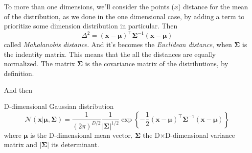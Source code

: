 \begin{frame}{\insertsubsection}
	To more than one dimensions, we'll consider the points ($x$) distance for the mean of the distribution, as we done in the one dimensional case, by adding a term to prioritize some dimension distribution in particular. Then
	\begin{equation*}
		\Delta^2 = (\mathbf{x} - \boldsymbol{\mu})^{\top} \boldsymbol{\Sigma} ^{-1} (\mathbf{x} - \boldsymbol{\mu}) 
	\end{equation*}
called \textit{Mahalanobis distance}. And it's becomes the \textit{Euclidean distance}, when $\boldsymbol{\Sigma}$ is the indentity matrix. This means that the all the distances are equally normalized. The matrix $\boldsymbol{\Sigma}$ is the covariance matrix of the distributions, by definition.
\end{frame}

\begin{frame}{\insertsubsection}
And then
\begin{block}{D-dimensional Gaussian distribution}
\begin{equation*}
	\mathcal{N}(\mathbf{x} | \boldsymbol{\mu}, \boldsymbol{\Sigma}) = \frac{1}{(2 \pi )^{D/2}} \frac{1}{|\boldsymbol{\Sigma}|^{1/2}} \exp \left\{ -\frac{1}{2} (\mathbf{x} - \boldsymbol{\mu})^{\top} \boldsymbol{\Sigma} ^{-1} (\mathbf{x} - \boldsymbol{\mu})  \right\} 
\end{equation*}
where $\boldsymbol{\mu}$ is the D-dimensional mean vector, $\boldsymbol{\Sigma}$ the D$\times$D-dimensional variance matrix and $|\boldsymbol{\Sigma}|$ its determinant.
\end{block}
\end{frame}

